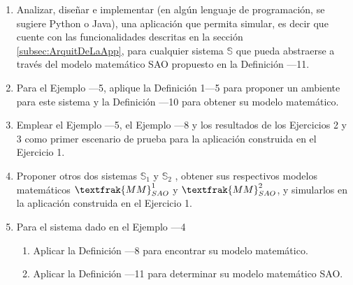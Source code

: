 \begin{enumerate}
    \item Analizar, diseñar e implementar (en algún lenguaje de programación, se sugiere Python o Java), una aplicación que permita simular, es decir que cuente con las funcionalidades descritas en la sección \ref{subsec:ArquitDeLaApp}, para cualquier sistema $\mathbb{S}$ que pueda abstraerse a través del modelo matemático SAO propuesto en la Definición —11.\\
    
    \item Para el Ejemplo —5, aplique la Definición 1—5 para proponer un ambiente para este sistema y la Definición —10 para obtener su modelo matemático.\\
    
    \item Emplear el Ejemplo —5, el Ejemplo —8 y los resultados de los Ejercicios 2 y 3 como primer escenario de prueba para la aplicación construida en el Ejercicio 1.\\
    
    \item Proponer otros dos sistemas $\mathbb{S}_1$ y $\mathbb{S}_2$ , obtener sus respectivos modelos matemáticos $\textfrak{MM }_{SAO}^1$ y $\textfrak{MM }_{SAO}^2$, y simularlos en la aplicación construida en el Ejercicio 1.\\
    
    \item Para el sistema dado en el Ejemplo —4
    \begin{enumerate}
        \item Aplicar la Definición —8 para encontrar su modelo matemático.
        \item Aplicar la Definición —11 para determinar su modelo matemático SAO.
    \end{enumerate}
\end{enumerate}


